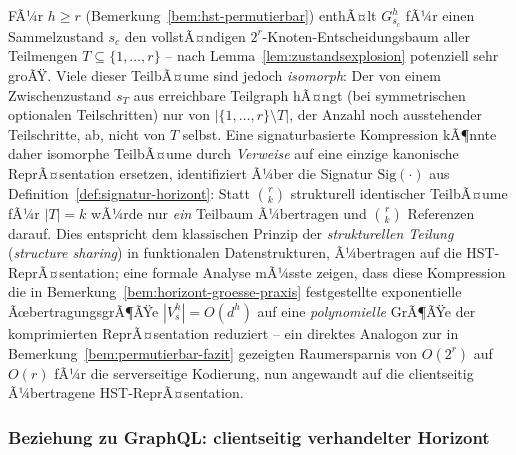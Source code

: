﻿\documentclass[a4paper,12pt]{article}
\theoremstyle{definition}
\begin{document}
FÃ¼r $h\ge r$ (Bemerkung~\ref{bem:hst-permutierbar}) enthÃ¤lt $G_{s_c}^h$ fÃ¼r einen
Sammelzustand $s_c$ den vollstÃ¤ndigen $2^r$-Knoten-Entscheidungsbaum aller Teilmengen
$T\subseteq\{1,\ldots,r\}$ -- nach Lemma~\ref{lem:zustandsexplosion} potenziell sehr
groÃŸ. Viele dieser TeilbÃ¤ume sind jedoch \emph{isomorph}: Der von einem Zwischenzustand
$s_T$ aus erreichbare Teilgraph hÃ¤ngt (bei symmetrischen optionalen Teilschritten) nur
von $|\{1,\ldots,r\}\setminus T|$, der Anzahl noch ausstehender Teilschritte, ab, nicht
von $T$ selbst. Eine signaturbasierte Kompression kÃ¶nnte daher isomorphe TeilbÃ¤ume durch
\emph{Verweise} auf eine einzige kanonische ReprÃ¤sentation ersetzen, identifiziert Ã¼ber
die Signatur $\mathrm{Sig}(\cdot)$ aus Definition~\ref{def:signatur-horizont}: Statt
$\binom{r}{k}$ strukturell identischer TeilbÃ¤ume fÃ¼r $|T|=k$ wÃ¼rde nur \emph{ein}
Teilbaum Ã¼bertragen und $\binom{r}{k}$ Referenzen darauf. Dies entspricht dem
klassischen Prinzip der \emph{strukturellen Teilung} (\emph{structure sharing}) in
funktionalen Datenstrukturen, Ã¼bertragen auf die HST-ReprÃ¤sentation; eine formale
Analyse mÃ¼sste zeigen, dass diese Kompression die in
Bemerkung~\ref{bem:horizont-groesse-praxis} festgestellte exponentielle
ÃœbertragungsgrÃ¶ÃŸe $|V_s^h|=O(d^h)$ auf eine \emph{polynomielle} GrÃ¶ÃŸe der komprimierten
ReprÃ¤sentation reduziert -- ein direktes Analogon zur in
Bemerkung~\ref{bem:permutierbar-fazit} gezeigten Raumersparnis von $O(2^r)$ auf $O(r)$
fÃ¼r die serverseitige Kodierung, nun angewandt auf die clientseitig Ã¼bertragene
HST-ReprÃ¤sentation.

\subsubsection{Beziehung zu GraphQL: clientseitig verhandelter Horizont}
\end{document}
